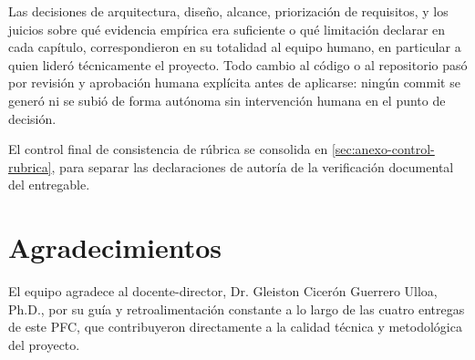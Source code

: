 Las decisiones de arquitectura, diseño, alcance, priorización de
requisitos, y los juicios sobre qué evidencia empírica era suficiente o
qué limitación declarar en cada capítulo, correspondieron en su
totalidad al equipo humano, en particular a quien lideró técnicamente
el proyecto. Todo cambio al código o al repositorio pasó por revisión y
aprobación humana explícita antes de aplicarse: ningún commit se generó
ni se subió de forma autónoma sin intervención humana en el punto de
decisión.

El control final de consistencia de rúbrica se consolida en
\autoref{sec:anexo-control-rubrica}, para separar las declaraciones de
autoría de la verificación documental del entregable.

\section{Agradecimientos}

El equipo agradece al docente-director, Dr. Gleiston Cicerón Guerrero
Ulloa, Ph.D., por su guía y retroalimentación constante a lo largo de
las cuatro entregas de este PFC, que contribuyeron directamente a la
calidad técnica y metodológica del proyecto.
